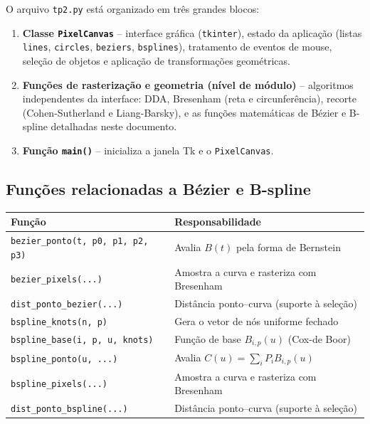 \documentclass[11pt,a4paper]{article}
\begin{document}
O arquivo \texttt{tp2.py} está organizado em três grandes blocos:

\begin{enumerate}
    \item \textbf{Classe \texttt{PixelCanvas}} -- interface gráfica (\texttt{tkinter}),
    estado da aplicação (listas \texttt{lines}, \texttt{circles}, \texttt{beziers},
    \texttt{bsplines}), tratamento de eventos de mouse, seleção de objetos e
    aplicação de transformações geométricas.

    \item \textbf{Funções de rasterização e geometria (nível de módulo)} --
    algoritmos independentes da interface: DDA, Bresenham (reta e
    circunferência), recorte (Cohen-Sutherland e Liang-Barsky), e as funções
    matemáticas de Bézier e B-spline detalhadas neste documento.

    \item \textbf{Função \texttt{main()}} -- inicializa a janela Tk e o
    \texttt{PixelCanvas}.
\end{enumerate}

\subsection{Funções relacionadas a Bézier e B-spline}

\begin{center}
\begin{tabular}{@{}ll@{}}
\toprule
\textbf{Função} & \textbf{Responsabilidade} \\
\midrule
\texttt{bezier\_ponto(t, p0, p1, p2, p3)} & Avalia $B(t)$ pela forma de Bernstein \\
\texttt{bezier\_pixels(...)} & Amostra a curva e rasteriza com Bresenham \\
\texttt{dist\_ponto\_bezier(...)} & Distância ponto--curva (suporte à seleção) \\
\texttt{bspline\_knots(n, p)} & Gera o vetor de nós uniforme fechado \\
\texttt{bspline\_base(i, p, u, knots)} & Função de base $B_{i,p}(u)$ (Cox-de Boor) \\
\texttt{bspline\_ponto(u, ...)} & Avalia $C(u) = \sum_i P_i B_{i,p}(u)$ \\
\texttt{bspline\_pixels(...)} & Amostra a curva e rasteriza com Bresenham \\
\texttt{dist\_ponto\_bspline(...)} & Distância ponto--curva (suporte à seleção) \\
\bottomrule
\end{tabular}
\end{center}
\end{document}
